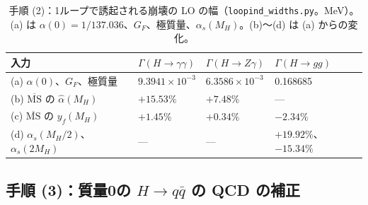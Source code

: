 \documentclass[a4paper,10pt]{ltjsarticle}
\newcommand{\MSbar}{\overline{\mathrm{MS}}}
\begin{document}
\begin{table}[tbp]
\centering\small
\caption{手順 (2)：1ループで誘起される崩壊の LO の幅（\texttt{loopind\_widths.py}。MeV）。(a) は $\alpha(0)=1/137.036$、$G_F$、極質量、$\alpha_s(M_H)$。(b)〜(d) は (a) からの変化。}
\label{tab:liwidths}
\begin{tabular}{llll}
\toprule
入力 & $\Gamma(H\to\gamma\gamma)$ & $\Gamma(H\to Z\gamma)$ & $\Gamma(H\to gg)$ \\
\midrule
(a) $\alpha(0)$、$G_F$、極質量 & $9.3941\times10^{-3}$ & $6.3586\times10^{-3}$ & 0.168685 \\
(b) $\MSbar$ の $\hat\alpha(M_H)$ & $+15.53\%$ & $+7.48\%$ & — \\
(c) $\MSbar$ の $y_f(M_H)$ & $+1.45\%$ & $+0.34\%$ & $-2.34\%$ \\
(d) $\alpha_s(M_H/2)$、$\alpha_s(2M_H)$ & — & — & $+19.92\%$、$-15.34\%$ \\
\bottomrule
\end{tabular}
\end{table}

\subsection{手順 (3)：質量0の $H\to q\bar q$ の QCD の補正}\label{sec:step3}
\end{document}
